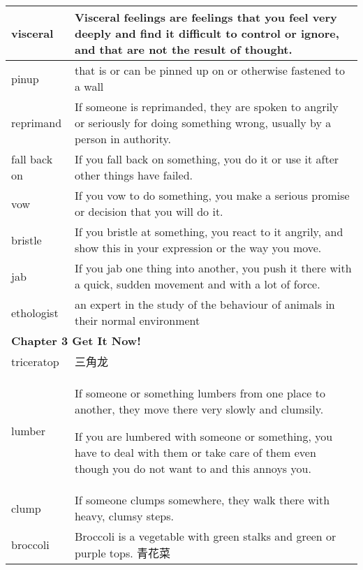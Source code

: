 \documentclass{article}
\begin{document}
\begin{center}
\begin{longtable}{|l|p{9cm}|}
\hline
visceral
&
Visceral feelings are feelings that you feel very deeply and find it difficult to control or ignore, and that are not the result of thought.
\\

\hline
pinup
&
that is or can be pinned up on or otherwise fastened to a wall
\\

\hline
reprimand
&
If someone is reprimanded, they are spoken to angrily or seriously for doing something wrong, usually by a person in authority.
\\

\hline
fall back on
&
If you fall back on something, you do it or use it after other things have failed.
\\

\hline
vow
&
If you vow to do something, you make a serious promise or decision that you will do it.
\\

\hline
bristle
&
If you bristle at something, you react to it angrily, and show this in your expression or the way you move.
\\

\hline
jab
&
If you jab one thing into another, you push it there with a quick, sudden movement and with a lot of force.
\\

\hline
ethologist
&
an expert in the study of the behaviour of animals in their normal environment
\\

\hline
\multicolumn{2}{|l|}{\textbf{Chapter 3 Get It Now!}}\\

\hline
triceratop
&
三角龙
\\

\hline
lumber
&
If someone or something lumbers from one place to another, they move there very slowly and clumsily.
\par
If you are lumbered with someone or something, you have to deal with them or take care of them even though you do not want to and this annoys you.
\\

\hline
clump
&
If someone clumps somewhere, they walk there with heavy, clumsy steps.
\\

\hline
broccoli
&
Broccoli is a vegetable with green stalks and green or purple tops. 青花菜
\\


\end{longtable}
\end{center}
\end{document}
